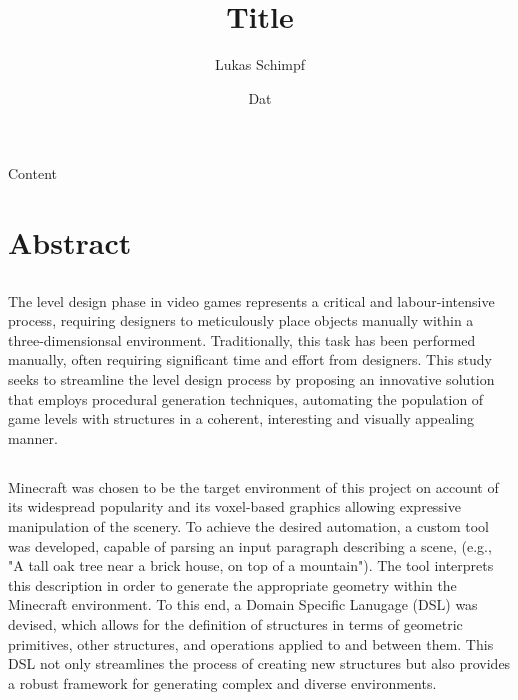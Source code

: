 \documentclass[11pt, a4paper]{article}
\begin{document}
\title{Title}
\author{Lukas Schimpf}
\date{Dat}
\maketitle
\pagebreak

\begin{flushleft}
Content
\pagebreak

\section*{Abstract}

    \subsection*{}
    The level design phase in video games represents a critical and labour-intensive process, requiring designers to meticulously place objects manually within a three-dimensionsal environment.
    Traditionally, this task has been performed manually, often requiring significant time and effort from designers.
    This study seeks to streamline the level design process by proposing an innovative solution that employs procedural generation techniques, automating the population of game levels with structures in a coherent, interesting and visually appealing manner.


    \subsection*{}
    Minecraft was chosen to be the target environment of this project on account of its widespread popularity and its voxel-based graphics allowing expressive manipulation of the scenery.
    To achieve the desired automation, a custom tool was developed, capable of parsing an input paragraph describing a scene, (e.g., "A tall oak tree near a brick house, on top of a mountain"). The tool interprets this description in order to generate the appropriate geometry within the Minecraft environment.
    To this end, a Domain Specific Lanugage (DSL) was devised, which allows for the definition of structures in terms of geometric primitives, other structures, and operations applied to and between them.
    This DSL not only streamlines the process of creating new structures but also provides a robust framework for generating complex and diverse environments.



\end{flushleft}
\end{document}
